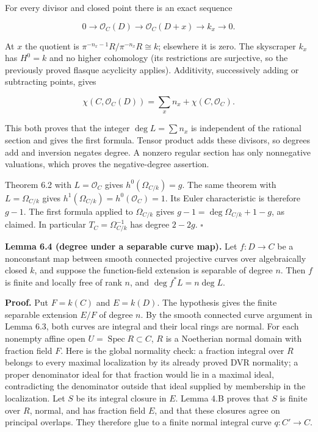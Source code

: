 \documentclass[11pt,a4paper,openany]{report}
\newcounter{none}
\begin{document}
For every divisor and closed point there is an exact sequence

\[
0\longrightarrow\mathcal O_C(D)\longrightarrow\mathcal O_C(D+x)
\longrightarrow k_x\longrightarrow0.
\]

At \(x\) the quotient is \(\pi^{-n_x-1}R/\pi^{-n_x}R\cong k\); elsewhere it is zero. The skyscraper \(k_x\) has \(H^0=k\) and no higher cohomology (its restrictions are surjective, so the previously proved flasque acyclicity applies). Additivity, successively adding or subtracting points, gives

\[
\chi(C,\mathcal O_C(D))=\sum_xn_x+\chi(C,\mathcal O_C).
\]

This both proves that the integer \(\deg L=\sum n_x\) is independent of the rational section and gives the first formula. Tensor product adds these divisors, so degrees add and inversion negates degree. A nonzero regular section has only nonnegative valuations, which proves the negative-degree assertion.

Theorem 6.2 with \(L=\mathcal O_C\) gives \(h^0(\Omega_{C/k})=g\). The same theorem with \(L=\Omega_{C/k}\) gives \(h^1(\Omega_{C/k})=h^0(\mathcal O_C)=1\). Its Euler characteristic is therefore \(g-1\). The first formula applied to \(\Omega_{C/k}\) gives \(g-1=\deg\Omega_{C/k}+1-g\), as claimed. In particular \(T_C=\Omega_{C/k}^{-1}\) has degree \(2-2g\). \(\square\)

\textbf{Lemma 6.4 (degree under a separable curve map).} Let \(f:D\to C\) be a nonconstant map between smooth connected projective curves over algebraically closed \(k\), and suppose the function-field extension is separable of degree \(n\). Then \(f\) is finite and locally free of rank \(n\), and \(\deg f^*L=n\deg L\).

\textbf{Proof.} Put \(F=k(C)\) and \(E=k(D)\). The hypothesis gives the finite separable extension \(E/F\) of degree \(n\). By the smooth connected curve argument in Lemma 6.3, both curves are integral and their local rings are normal. For each nonempty affine open \(U=\operatorname{Spec}R\subset C\), \(R\) is a Noetherian normal domain with fraction field \(F\). Here is the global normality check: a fraction integral over \(R\) belongs to every maximal localization by its already proved DVR normality; a proper denominator ideal for that fraction would lie in a maximal ideal, contradicting the denominator outside that ideal supplied by membership in the localization. Let \(S\) be its integral closure in \(E\). Lemma 4.B proves that \(S\) is finite over \(R\), normal, and has fraction field \(E\), and that these closures agree on principal overlaps. They therefore glue to a finite normal integral curve \(q:C'\to C\).
\end{document}
